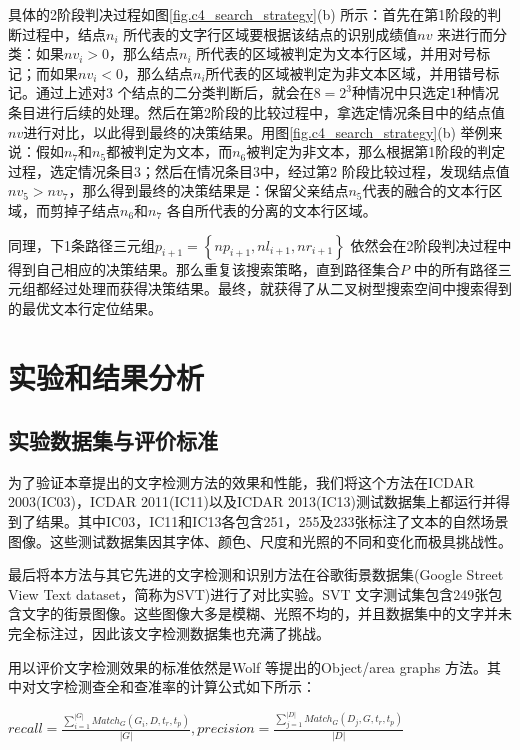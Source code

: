         具体的2阶段判决过程如图\ref{fig.c4_search_strategy}(b) 所示：首先在第1阶段的判断过程中，结点$n_i$ 所代表的文字行区域要根据该结点的识别成绩值$nv$ 来进行而分类：如果$nv_i>0$，那么结点$n_i$ 所代表的区域被判定为文本行区域，并用对号标记；而如果$nv_i<0$，那么结点$n_i$所代表的区域被判定为非文本区域，并用错号标记。通过上述对3 个结点的二分类判断后，就会在$8=2^3$种情况中只选定1种情况条目进行后续的处理。然后在第2阶段的比较过程中，拿选定情况条目中的结点值$nv$进行对比，以此得到最终的决策结果。用图\ref{fig.c4_search_strategy}(b) 举例来说：假如$n_7$和$n_5$都被判定为文本，而$n_6$被判定为非文本，那么根据第1阶段的判定过程，选定情况条目3；然后在情况条目3中，经过第2 阶段比较过程，发现结点值$nv_5>nv_7$，那么得到最终的决策结果是：保留父亲结点$n_5$代表的融合的文本行区域，而剪掉子结点$n_6$和$n_7$ 各自所代表的分离的文本行区域。

        同理，下1条路径三元组$p_{i+1}=\left\{np_{i+1},nl_{i+1},nr_{i+1}\right\}$ 依然会在2阶段判决过程中得到自己相应的决策结果。那么重复该搜索策略，直到路径集合$P$ 中的所有路径三元组都经过处理而获得决策结果。最终，就获得了从二叉树型搜索空间中搜索得到的最优文本行定位结果。

    \section{实验和结果分析}

        \subsection{实验数据集与评价标准}

        为了验证本章提出的文字检测方法的效果和性能，我们将这个方法在ICDAR 2003(IC03)，ICDAR 2011(IC11)以及ICDAR 2013(IC13)测试数据集上都运行并得到了结果。其中IC03，IC11和IC13各包含251，255及233张标注了文本的自然场景图像。这些测试数据集因其字体、颜色、尺度和光照的不同和变化而极具挑战性。

        最后将本方法与其它先进的文字检测和识别方法在谷歌街景数据集(Google Street View Text dataset，简称为SVT)进行了对比实验。SVT 文字测试集包含249张包含文字的街景图像。这些图像大多是模糊、光照不均的，并且数据集中的文字并未完全标注过，因此该文字检测数据集也充满了挑战。

        用以评价文字检测效果的标准依然是Wolf 等\cite{Wolf2006Object}提出的Object/area graphs 方法。其中对文字检测查全和查准率的计算公式如下所示：

        $recall = \frac {\sum_{i=1}^{|G|}Match_G(G_i,D,t_r,t_p)} {|G|}  ,   precision =\frac {\sum_{j=1}^{|D|}Match_G(D_j,G,t_r,t_p)} {|D|}$

